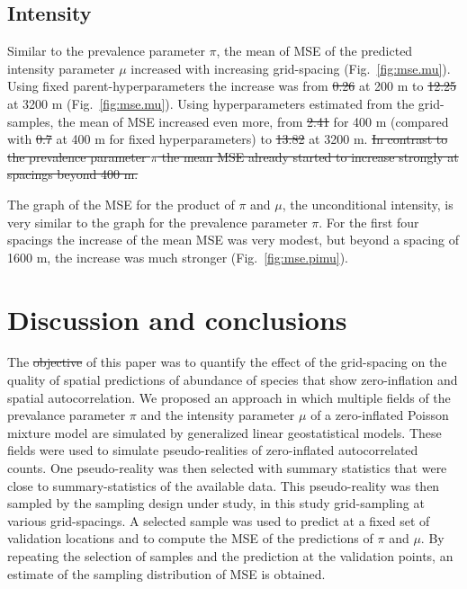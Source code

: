 \documentclass[review]{elsarticle}
\providecommand{\DIFadd}[1]{{\protect\color{blue}\uwave{#1}}} %
\providecommand{\DIFdel}[1]{{\protect\color{red}\sout{#1}}}                      %
\providecommand{\DIFaddbegin}{} %
\providecommand{\DIFaddend}{} %
\providecommand{\DIFdelbegin}{} %
\providecommand{\DIFdelend}{} %
\begin{document}
\subsection{Intensity}
Similar to the prevalence parameter $\pi$, the  mean of MSE of the predicted intensity parameter $\mu$ increased with increasing grid-spacing (Fig.~\ref{fig:mse.mu}). Using fixed parent-hyperparameters the increase was from \DIFdelbegin \DIFdel{0.26 }\DIFdelend \DIFaddbegin \DIFadd{14.73 }\DIFaddend at 200 m to \DIFdelbegin \DIFdel{12.25 }\DIFdelend \DIFaddbegin \DIFadd{28.84 }\DIFaddend at 3200 m (Fig.~\ref{fig:mse.mu}). Using hyperparameters estimated from the grid-samples, the mean of MSE increased even more, from \DIFdelbegin \DIFdel{2.41 }\DIFdelend \DIFaddbegin \DIFadd{15.89 }\DIFaddend for 400 m (compared with \DIFdelbegin \DIFdel{0.7 }\DIFdelend \DIFaddbegin \DIFadd{15.73 }\DIFaddend at 400 m for fixed hyperparameters) to \DIFdelbegin \DIFdel{13.82 }\DIFdelend \DIFaddbegin \DIFadd{32.32 }\DIFaddend at 3200 m.  
\DIFdelbegin \DIFdel{In contrast to the prevalence parameter $\pi$ the mean MSE already started to increase strongly at spacings beyond 400 m.
}\DIFdelend 

The  graph of the MSE for the product of $\pi$ and $\mu$, the unconditional intensity, is very similar to the graph for the prevalence parameter $\pi$. For the first four spacings the increase of the mean MSE was very modest, but beyond a spacing of 1600 m, the increase was much stronger (Fig.~\ref{fig:mse.pimu}).  

\section{Discussion and conclusions}\label{sec:discussion}
The \DIFdelbegin \DIFdel{objective }\DIFdelend \DIFaddbegin \DIFadd{aim }\DIFaddend of this paper was to quantify the effect of the grid-spacing on the quality of spatial predictions of abundance of species that show zero-inflation and spatial autocorrelation. We proposed an approach in which multiple fields of the prevalance parameter $\pi$ and the intensity parameter $\mu$ of a zero-inflated Poisson mixture model are simulated by generalized linear geostatistical models. These fields were used to simulate pseudo-realities of zero-inflated autocorrelated counts. One pseudo-reality was then selected with summary statistics that were close to summary-statistics of the available data. This pseudo-reality was then sampled by the sampling design under study, in this study grid-sampling at various grid-spacings. A selected sample was used to predict at a fixed set of validation locations and to compute the MSE of the predictions of $\pi$ and $\mu$. By repeating the selection of samples and the prediction at the validation points, an estimate of the sampling distribution of MSE is obtained.
\end{document}
